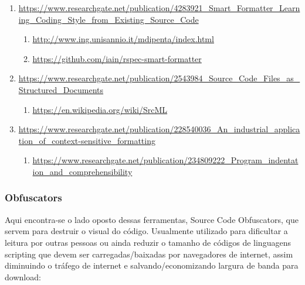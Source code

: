 \begin{englishtext}
\begin{sloppypar}
\begin{bluebox}
\begin{enumerate}[leftmargin=*,parsep=0pt]
    \item \url{https://www.researchgate.net/publication/4283921_Smart_Formatter_Learning_Coding_Style_from_Existing_Source_Code}
    \begin{enumerate}[nolistsep,topsep=0pt,label=$\star$]
        \item \url{http://www.ing.unisannio.it/mdipenta/index.html}
        \item \url{https://github.com/iain/rspec-smart-formatter}
    \end{enumerate}

    \item \url{https://www.researchgate.net/publication/2543984_Source_Code_Files_as_Structured_Documents}
    \begin{enumerate}[nolistsep,topsep=0pt,label=$\star$]
        \item \url{https://en.wikipedia.org/wiki/SrcML}
    \end{enumerate}

    \item \url{https://www.researchgate.net/publication/228540036_An_industrial_application_of_context-sensitive_formatting}
    \begin{enumerate}[nolistsep,topsep=0pt,label=$\star$]
        \item \url{https://www.researchgate.net/publication/234809222_Program_indentation_and_comprehensibility}
    \end{enumerate}

    \end{enumerate}
    \end{bluebox}
    \end{sloppypar}


\subsubsection{Obfuscators}

    Aqui encontra-se o lado oposto dessas ferramentas, Source Code Obfuscators, que servem para
    destruir o visual do código. Usualmente utilizado para dificultar a leitura por outras pessoas
    ou ainda reduzir o tamanho de códigos de linguagens scripting que devem ser carregadas/baixadas
    por navegadores de internet, assim diminuindo o tráfego de internet e salvando/economizando
    largura de banda para download:

    \begin{sloppypar}
    \begin{bluebox}\RaggedRight
    \begin{enumerate}[leftmargin=*,parsep=0pt]


\end{enumerate}
\end{bluebox}
\end{sloppypar}
\end{englishtext}
